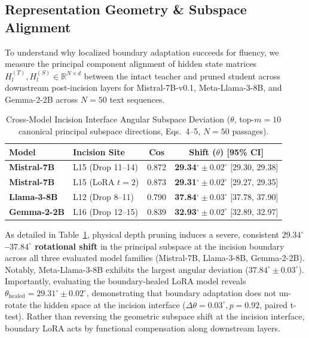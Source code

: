 \documentclass[11pt]{article}
\begin{document}
\subsection{Representation Geometry \& Subspace Alignment}

To understand why localized boundary adaptation succeeds for fluency, we measure the principal component alignment of hidden state matrices $H^{(T)}_l, H^{(S)}_l \in \mathbb{R}^{N \times d}$ between the intact teacher and pruned student across downstream post-incision layers for Mistral-7B-v0.1, Meta-Llama-3-8B, and Gemma-2-2B across $N=50$ text sequences.

\begin{table}[t!]
\centering
\footnotesize
\setlength{\tabcolsep}{2.5pt}
\caption{Cross-Model Incision Interface Angular Subspace Deviation ($\theta$, top-$m=10$ canonical principal subspace directions, Eqs.~4--5, $N=50$ passages).}
\label{tab:cross_model_geometry}
\begin{tabular}{llcc}
\toprule
\textbf{Model} & \textbf{Incision Site} & \textbf{Cos} & \textbf{Shift ($\theta$) [95\% CI]} \\
\midrule
\textbf{Mistral-7B} & L15 (Drop 11--14) & 0.872 & \textbf{29.34}$^\circ \!\pm\! 0.02^\circ$ [29.30, 29.38] \\
\textbf{Mistral-7B} & L15 (LoRA $t{=}2$) & 0.873 & \textbf{29.31}$^\circ \!\pm\! 0.02^\circ$ [29.27, 29.35] \\
\textbf{Llama-3-8B} & L12 (Drop 8--11) & 0.790 & \textbf{37.84}$^\circ \!\pm\! 0.03^\circ$ [37.78, 37.90] \\
\textbf{Gemma-2-2B} & L16 (Drop 12--15) & 0.839 & \textbf{32.93}$^\circ \!\pm\! 0.02^\circ$ [32.89, 32.97] \\
\bottomrule
\end{tabular}
\end{table}

As detailed in Table~\ref{tab:cross_model_geometry}, physical depth pruning induces a severe, consistent \textbf{$29.34^\circ$--$37.84^\circ$ rotational shift} in the principal subspace at the incision boundary across all three evaluated model families (Mistral-7B, Llama-3-8B, Gemma-2-2B). Notably, Meta-Llama-3-8B exhibits the largest angular deviation ($37.84^\circ \pm 0.03^\circ$). Importantly, evaluating the boundary-healed LoRA model reveals $\theta_{\text{healed}} = 29.31^\circ \pm 0.02^\circ$, demonstrating that boundary adaptation does not un-rotate the hidden space at the incision interface ($\Delta \theta = 0.03^\circ, p = 0.92$, paired t-test). Rather than reversing the geometric subspace shift at the incision interface, boundary LoRA acts by functional compensation along downstream layers.
\end{document}
